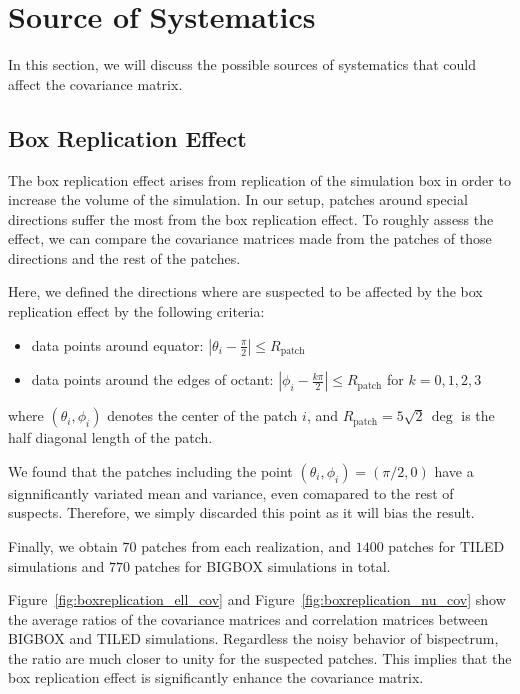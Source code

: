 \section{Source of Systematics}
In this section, we will discuss the possible sources of systematics that could affect the covariance matrix. 

\subsection{Box Replication Effect}\label{sec:boxreplication}
The box replication effect arises from replication of the simulation box in order to increase the volume of the simulation. In our setup, patches around special directions suffer the most from the box replication effect. To roughly assess the effect, we can compare the covariance matrices made from the patches of those directions and the rest of the patches.

Here, we defined the directions where are suspected to be affected by the box replication effect by the following criteria:
\begin{itemize}
    \item data points around equator: $ \left| \theta_i - \frac{\pi}{2} \right| \leq R_{\text{patch}} $
    \item data points around the edges of octant: $ \left| \phi_i - \frac{k\pi}{2} \right| \leq R_{\text{patch}} $ for $k=0,1,2,3$
\end{itemize}
where $(\theta_i, \phi_i)$ denotes the center of the patch $i$, and $R_{\text{patch}} = 5\sqrt{2}\, \mathrm{\deg}$ is the half diagonal length of the patch. 

We found that the patches including the point $(\theta_i, \phi_i) = (\pi/2, 0)$ have a signnificantly variated mean and variance, even comapared to the rest of suspects. Therefore, we simply discarded this point as it will bias the result. 

Finally, we obtain $70$ patches from each realization, and $1400$ patches for TILED simulations and $770$ patches for BIGBOX simulations in total.

Figure~\ref{fig:boxreplication_ell_cov} and Figure~\ref{fig:boxreplication_nu_cov} show the average ratios of the covariance matrices and correlation matrices between BIGBOX and TILED simulations. Regardless the noisy behavior of bispectrum, the ratio are much closer to unity for the suspected patches. This implies that the box replication effect is significantly enhance the covariance matrix.


